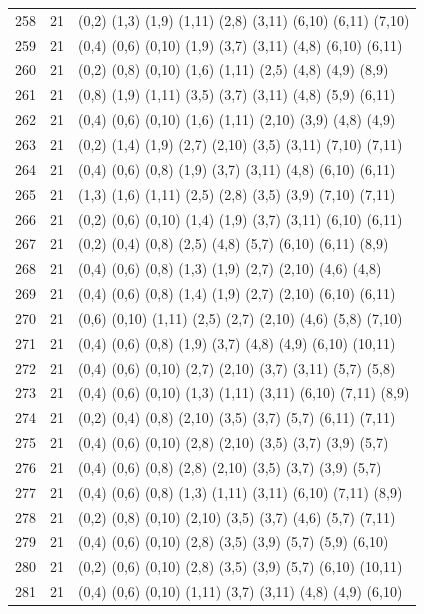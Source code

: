 {\begin{longtable}{lll}
258 & 21 & (0,2) (1,3) (1,9) (1,11) (2,8) (3,11) (6,10) (6,11) (7,10) \\
259 & 21 & (0,4) (0,6) (0,10) (1,9) (3,7) (3,11) (4,8) (6,10) (6,11) \\
260 & 21 & (0,2) (0,8) (0,10) (1,6) (1,11) (2,5) (4,8) (4,9) (8,9) \\
261 & 21 & (0,8) (1,9) (1,11) (3,5) (3,7) (3,11) (4,8) (5,9) (6,11) \\
262 & 21 & (0,4) (0,6) (0,10) (1,6) (1,11) (2,10) (3,9) (4,8) (4,9) \\
263 & 21 & (0,2) (1,4) (1,9) (2,7) (2,10) (3,5) (3,11) (7,10) (7,11) \\
264 & 21 & (0,4) (0,6) (0,8) (1,9) (3,7) (3,11) (4,8) (6,10) (6,11) \\
265 & 21 & (1,3) (1,6) (1,11) (2,5) (2,8) (3,5) (3,9) (7,10) (7,11) \\
266 & 21 & (0,2) (0,6) (0,10) (1,4) (1,9) (3,7) (3,11) (6,10) (6,11) \\
267 & 21 & (0,2) (0,4) (0,8) (2,5) (4,8) (5,7) (6,10) (6,11) (8,9) \\
268 & 21 & (0,4) (0,6) (0,8) (1,3) (1,9) (2,7) (2,10) (4,6) (4,8) \\
269 & 21 & (0,4) (0,6) (0,8) (1,4) (1,9) (2,7) (2,10) (6,10) (6,11) \\
270 & 21 & (0,6) (0,10) (1,11) (2,5) (2,7) (2,10) (4,6) (5,8) (7,10) \\
271 & 21 & (0,4) (0,6) (0,8) (1,9) (3,7) (4,8) (4,9) (6,10) (10,11) \\
272 & 21 & (0,4) (0,6) (0,10) (2,7) (2,10) (3,7) (3,11) (5,7) (5,8) \\
273 & 21 & (0,4) (0,6) (0,10) (1,3) (1,11) (3,11) (6,10) (7,11) (8,9) \\
274 & 21 & (0,2) (0,4) (0,8) (2,10) (3,5) (3,7) (5,7) (6,11) (7,11) \\
275 & 21 & (0,4) (0,6) (0,10) (2,8) (2,10) (3,5) (3,7) (3,9) (5,7) \\
276 & 21 & (0,4) (0,6) (0,8) (2,8) (2,10) (3,5) (3,7) (3,9) (5,7) \\
277 & 21 & (0,4) (0,6) (0,8) (1,3) (1,11) (3,11) (6,10) (7,11) (8,9) \\
278 & 21 & (0,2) (0,8) (0,10) (2,10) (3,5) (3,7) (4,6) (5,7) (7,11) \\
279 & 21 & (0,4) (0,6) (0,10) (2,8) (3,5) (3,9) (5,7) (5,9) (6,10) \\
280 & 21 & (0,2) (0,6) (0,10) (2,8) (3,5) (3,9) (5,7) (6,10) (10,11) \\
281 & 21 & (0,4) (0,6) (0,10) (1,11) (3,7) (3,11) (4,8) (4,9) (6,10) \\

\end{longtable}}
